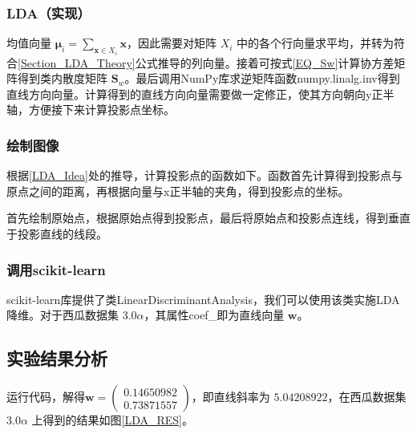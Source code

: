 \documentclass{ctexart}
\begin{document}
	\subsubsection{LDA（实现）}
	\label{LDA_MY}
	均值向量 $\bm{\mu}_i=\sum\limits_{\bm{x}\in X_i}\bm{x}$，因此需要对矩阵 $X_i$ 中的各个行向量求平均，并转为符合\ref{Section_LDA_Theory}公式推导的列向量。接着可按式\eqref{EQ_Sw}计算协方差矩阵得到类内散度矩阵 $\mathbf{S}_w$。最后调用NumPy库求逆矩阵函数numpy.linalg.inv得到直线方向向量。计算得到的直线方向向量需要做一定修正，使其方向朝向y正半轴，方便接下来计算投影点坐标。
	
	\subsubsection{绘制图像}
	根据\ref{LDA_Idea}处的推导，计算投影点的函数如下。函数首先计算得到投影点与原点之间的距离，再根据向量与x正半轴的夹角，得到投影点的坐标。
	
	
	首先绘制原始点，根据原始点得到投影点，最后将原始点和投影点连线，得到垂直于投影直线的线段。
	
	\subsubsection{调用scikit-learn}
	scikit-learn库提供了类LinearDiscriminantAnalysis，我们可以使用该类实施LDA降维。对于西瓜数据集 $3.0\alpha$，其属性coef\_即为直线向量 $\bm{w}$。
	
	
	\subsection{实验结果分析}
	
	运行代码，解得$\bm{w}=\begin{pmatrix}0.14650982\\0.73871557\end{pmatrix}$，即直线斜率为 $5.04208922$，在西瓜数据集 $3.0\alpha$ 上得到的结果如图\ref{LDA_RES}。
	
\end{document}
